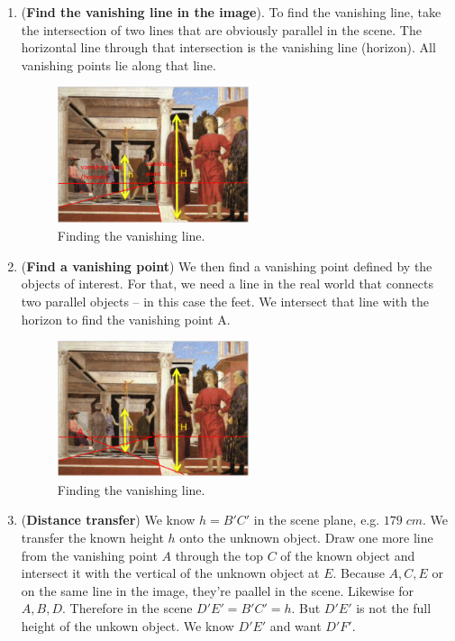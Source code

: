 \documentclass[a4paper]{article}
\begin{document}
\begin{enumerate}
    \item (\textbf{Find the vanishing line in the image}). To find the vanishing line, take the intersection of two lines that are obviously parallel in the scene. The horizontal line through that intersection is the vanishing line (horizon). All vanishing points lie along that line.
    \begin{figure}[H]
        \centering
        \includegraphics[height=4cm]{img/metrology_painting_2.png}
        \caption{Finding the vanishing line.}
    \end{figure}
    \item (\textbf{Find a vanishing point}) We then find a vanishing point defined by the objects of interest. For that, we need a line in the real world that connects two parallel objects -- in this case the feet. We intersect that line with the horizon to find the vanishing point A.
    \begin{figure}[H]
        \centering
        \includegraphics[height=4cm]{img/metrology_painting_3.png}
        \caption{Finding the vanishing line.}
    \end{figure}
    \item (\textbf{Distance transfer}) We know $h=B'C'$ in the scene plane, e.g. $179\; cm$. We transfer the known height $h$ onto the unknown object. Draw one more line from the vanishing point $A$ through the top $C$ of the known object and intersect it with the vertical of the unknown object at $E$. Because $A,C,E$ or on the same line in the image, they're paallel in the scene. Likewise for $A,B,D$. Therefore in the scene $D'E' = B'C' = h$. But $D'E'$ is not the full height of the unkown object. We know $D'E'$ and want $D'F'$.

\end{enumerate}
\end{document}
